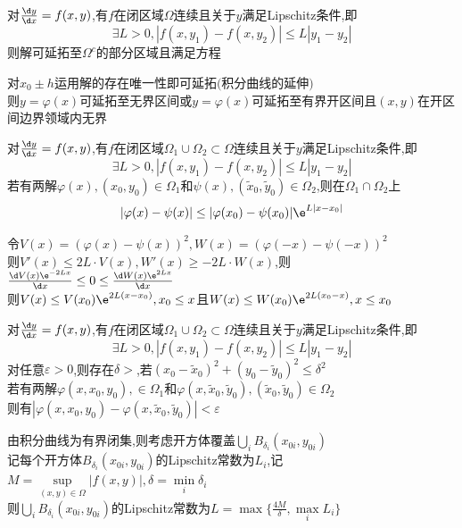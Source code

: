 \begin{dingli}
    对$\frac{\d y}{\d x}=f(x,y)$,有$f$在闭区域$\Omega$连续且关于$y$满足Lipschitz条件,即
    \[ \exists L>0,|f(x,y_1)-f(x,y_2)|\leqslant L|y_1-y_2|\]
    则解可延拓至$\Omega^{c}$的部分区域且满足方程
\end{dingli}

\begin{zhu}
    对$x_0\pm h$运用解的存在唯一性即可延拓$($积分曲线的延伸$)$\\
    则$y=\varphi(x)$可延拓至无界区间或$y=\varphi(x)$可延拓至有界开区间且$(x,y)$在开区间边界领域内无界
\end{zhu}

\begin{dingli}
    对$\frac{\d y}{\d x}=f(x,y)$,有$f$在闭区域$\Omega_1\cup\Omega_2\subset\Omega$连续且关于$y$满足Lipschitz条件,即
    \[ \exists L>0,|f(x,y_1)-f(x,y_2)|\leqslant L|y_1-y_2|\]
    若有两解$\varphi(x),(x_0,y_0)\in\Omega_1$和$\psi(x),(\widetilde{x}_0,\widetilde{y}_0)\in\Omega_2$,则在$\Omega_1\cap\Omega_2$上
    \[|\varphi(x)-\psi(x)|\leq|\varphi(x_0)-\psi(x_0)|\e^{L|x-x_0|}\]
\end{dingli}

\begin{zhu}
    令$V(x)=(\varphi(x)-\psi(x))^2,W(x)=(\varphi(-x)-\psi(-x))^2$\\
    则$V'(x)\leq 2L\cdot V(x), W'(x)\geq -2L\cdot W(x)$,则$\frac{\d V(x)\e^{-2Lx}}{\d x}\leq 0\leq \frac{\d W(x)\e^{2Lx}}{\d x}$\\
    则$V(x)\leq V(x_0)\e^{2L(x-x_0)},x_0\leq x$且$ W(x)\leq W(x_0)\e^{2L(x_0-x)},x\leq x_0$
\end{zhu}

\begin{dingli}
    对$\frac{\d y}{\d x}=f(x,y)$,有$f$在闭区域$\Omega_1\cup\Omega_2\subset\Omega$连续且关于$y$满足Lipschitz条件,即
    \[ \exists L>0,|f(x,y_1)-f(x,y_2)|\leqslant L|y_1-y_2|\]
    对任意$\varepsilon>0$,则存在$\delta>$,若$(x_0-\widetilde{x}_0)^2+(y_0-\widetilde{y}_0)^2\leq \delta^2$\\
    若有两解$\varphi(x,x_0,y_0),\in\Omega_1$和$\varphi(x,\widetilde{x}_0,\widetilde{y}_0),(\widetilde{x}_0,\widetilde{y}_0)\in\Omega_2$\\
    则有$|\varphi(x,x_0,y_0)-\varphi(x,\widetilde{x}_0,\widetilde{y}_0)|<\varepsilon$
\end{dingli}

\begin{zhu}
    由积分曲线为有界闭集,则考虑开方体覆盖$\bigcup\limits_{i}B_{\delta_i}(x_{0i},y_{0i})$\\
    记每个开方体$B_{\delta_i}(x_{0i},y_{0i})$的Lipschitz常数为$L_i$,记$M=\sup\limits_{(x,y)\in\Omega}|f(x,y)|,\delta=\min\limits_{i}\delta_i$\\
    则$\bigcup\limits_{i}B_{\delta_i}(x_{0i},y_{0i})$的Lipschitz常数为$L=\max\{\frac{4M}{\delta},\max\limits_{i}L_i\}$
\end{zhu}

